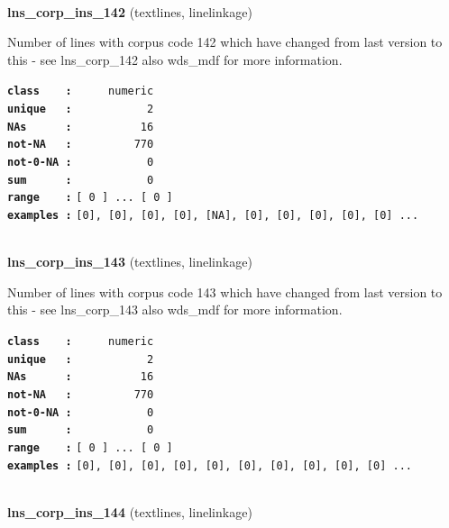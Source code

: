 \documentclass[]{article}
\begin{document}
~

\textbf{lns\_corp\_ins\_142} (textlines, linelinkage)

Number of lines with corpus code 142 which have changed from last
version to this - see lns\_corp\_142 also wds\_mdf for more information.

\textbf{\texttt{class\ \ \ \ :}} \texttt{~~~~~numeric}\\
\textbf{\texttt{unique\ \ \ :}} \texttt{~~~~~~~~~~~2}\\
\textbf{\texttt{NAs\ \ \ \ \ \ :}} \texttt{~~~~~~~~~~16}\\
\textbf{\texttt{not-NA\ \ \ :}} \texttt{~~~~~~~~~770}\\
\textbf{\texttt{not-0-NA\ :}} \texttt{~~~~~~~~~~~0}\\
\textbf{\texttt{sum\ \ \ \ \ \ :}} \texttt{~~~~~~~~~~~0}\\
\textbf{\texttt{range\ \ \ \ :}}
\texttt{{[}\ 0\ {]}\ ...\ {[}\ 0\ {]}}\\
\textbf{\texttt{examples\ :}}
\texttt{{[}0{]},\ {[}0{]},\ {[}0{]},\ {[}0{]},\ {[}NA{]},\ {[}0{]},\ {[}0{]},\ {[}0{]},\ {[}0{]},\ {[}0{]}\ ...}\\

~

\textbf{lns\_corp\_ins\_143} (textlines, linelinkage)

Number of lines with corpus code 143 which have changed from last
version to this - see lns\_corp\_143 also wds\_mdf for more information.

\textbf{\texttt{class\ \ \ \ :}} \texttt{~~~~~numeric}\\
\textbf{\texttt{unique\ \ \ :}} \texttt{~~~~~~~~~~~2}\\
\textbf{\texttt{NAs\ \ \ \ \ \ :}} \texttt{~~~~~~~~~~16}\\
\textbf{\texttt{not-NA\ \ \ :}} \texttt{~~~~~~~~~770}\\
\textbf{\texttt{not-0-NA\ :}} \texttt{~~~~~~~~~~~0}\\
\textbf{\texttt{sum\ \ \ \ \ \ :}} \texttt{~~~~~~~~~~~0}\\
\textbf{\texttt{range\ \ \ \ :}}
\texttt{{[}\ 0\ {]}\ ...\ {[}\ 0\ {]}}\\
\textbf{\texttt{examples\ :}}
\texttt{{[}0{]},\ {[}0{]},\ {[}0{]},\ {[}0{]},\ {[}0{]},\ {[}0{]},\ {[}0{]},\ {[}0{]},\ {[}0{]},\ {[}0{]}\ ...}\\

~

\textbf{lns\_corp\_ins\_144} (textlines, linelinkage)
\end{document}
